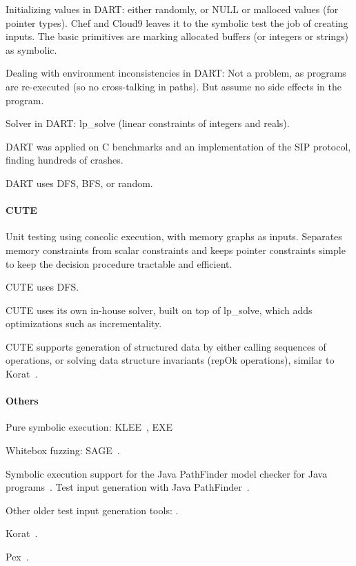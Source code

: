 Initializing values in DART: either randomly, or NULL or malloced values (for pointer types).  Chef and Cloud9 leaves it to the symbolic test the job of creating inputs. The basic primitives are marking allocated buffers (or integers or strings) as symbolic.

Dealing with environment inconsistencies in DART: Not a problem, as programs are re-executed (so no cross-talking in paths).  But assume no side effects in the program.

Solver in DART: lp\_solve (linear constraints of integers and reals).

DART was applied on C benchmarks and an implementation of the SIP protocol, finding hundreds of crashes.

DART uses DFS, BFS, or random.

\paragraph{CUTE}

Unit testing using concolic execution, with memory graphs as inputs.  Separates memory constraints from scalar constraints and keeps pointer constraints simple to keep the decision procedure tractable and efficient.

CUTE uses DFS.

CUTE uses its own in-house solver, built on top of lp\_solve, which adds optimizations such as incrementality.

CUTE supports generation of structured data by either calling sequences of operations, or solving data structure invariants (repOk operations), similar to Korat~\cite{boyapati:korat}.

\paragraph{Others}

Pure symbolic execution: KLEE~\cite{klee}, EXE~\cite{exe}

Whitebox fuzzing: SAGE~\cite{sage2012,godefroid:fuzz}.

Symbolic execution support for the Java PathFinder model checker for Java programs~\cite{jpf-symbex}.  Test input generation with Java PathFinder~\cite{jpf-testgen}.

Other older test input generation tools: \cite{genptrinputs}.

Korat~\cite{boyapati:korat}.

Pex~\cite{tillmann-pex}.

